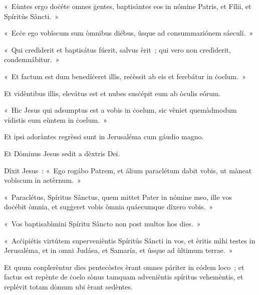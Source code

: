 «~Eùntes ergo doċéte omnes ġentes, baptisàntes eos in nómine Patris, et Fílii, et Spíritůs Sâncti.~» 

«~Ecċe ego vobîscum sum òmnibus diébus, ûsque ad consummaziónem sáeculi.~» 

«~Qui credìderit et baptisátus fúerit, salvus èrit~; qui vero non credìderit, condemnábitur.~» 

«~Et factum est dum benedíċeret illis, reċèssit ab eis et ferebátur in ċoelum.~» 

Et vidèntibus illis, elevátus est et nubes susċépit eum ab òculis eórum. 

«~Hic Jesus qui adsumptus est a vobis in ċoelum, sic vèniet quemàdmodum vídistis eum eùntem in ċoelum.~» 

Et ipsi adoràntes regrèssi sunt in Jerusaléma cum gáudio magno. 

Et Dòminus Jesus sedit a dèxtris Dei. 

\mysteryEnd
{}

Dîxit Jesus~: «~Ego rogábo Patrem, et álium paraclétum dabit vobis, ut màneat vobîscum in aetèrnum.~» 

«~Paraclétus, Spíritus Sânctus, quem mittet Pater in nómine meo, ille vos doċébit òmnia, et sugġeret vobis òmnia quáecumque dîxero vobis.~» 

«~Vos baptisabìmini Spíritu Sâncto non post multos hos dies.~» 

«~Acċipiétis virtútem supervenièntis Spíritůs Sâncti in vos, et èritis mìhi testes in Jerusaléma, et in omni Judáea, et Samaría, et ûsque ad ùltimum terrae.~» 

Et quum conplerèntur dies pentecòstes èrant omnes páriter in eódem loco~; et factus est repènte de ċoelo sònus tamquam advenièntis spíritus vehemèntis, et replévit totam dòmum ubi èrant sedèntes. 

